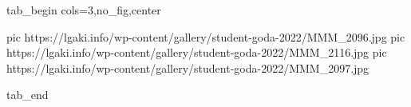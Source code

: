  
 
 
 
 


\ifcmt
  tab_begin cols=3,no_fig,center

     pic https://lgaki.info/wp-content/gallery/student-goda-2022/MMM_2096.jpg
		 pic https://lgaki.info/wp-content/gallery/student-goda-2022/MMM_2116.jpg
		 pic https://lgaki.info/wp-content/gallery/student-goda-2022/MMM_2097.jpg

  tab_end
\fi
